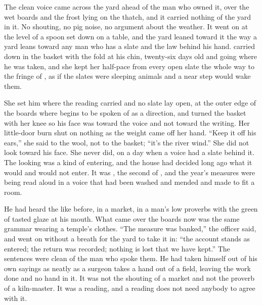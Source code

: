 
The clean voice came across the yard ahead of the man who owned it, over the wet boards and the frost lying on the thatch, and it carried nothing of the yard in it. No shouting, no pig noise, no argument about the weather. It went on at the level of a spoon set down on a table, and the yard leaned toward it the way a yard leans toward any man who has a slate and the law behind his hand.  carried  down in the basket with the fold at his chin, twenty-six days old and going where he was taken, and she kept her half-pace from every open slate the whole way to the fringe of , as if the slates were sleeping animals and a near step would wake them.

She set him where the reading carried and no slate lay open, at the outer edge of the boards where  begins to be spoken of as a direction, and turned the basket with her knee so his face was toward the voice and not toward the writing. Her little-door burn shut on nothing as the weight came off her hand. “Keep it off his ears,” she said to the wool, not to the basket; “it's the river wind.” She did not look toward his face. She never did, on a day when a voice had a slate behind it. The looking was a kind of entering, and the house had decided long ago what it would and would not enter. It was , the second of , and the year's measures were being read aloud in a voice that had been washed and mended and made to fit a room.

He had heard the like before, in a market, in a man's low proverbs with the green of tasted glaze at his mouth. What came over the boards now was the same grammar wearing a temple's clothes. “The measure was banked,” the officer said, and went on without a breath for the yard to take it in: “the account stands as entered; the return was recorded; nothing is lost that we have kept.” The sentences were clean of the man who spoke them. He had taken himself out of his own sayings as neatly as a surgeon takes a hand out of a field, leaving the work done and no hand in it. It was not the shouting of a market and not the proverb of a kiln-master. It was a reading, and a reading does not need anybody to agree with it.

